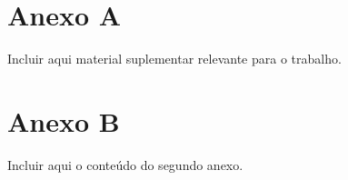 %


\cleardoublepage
\appendix
{}

\chapter{Anexo A}
\label{anx:a}

Incluir aqui material suplementar relevante para o trabalho.

% 

\chapter{Anexo B}
\label{anx:b}

Incluir aqui o conteúdo do segundo anexo.

